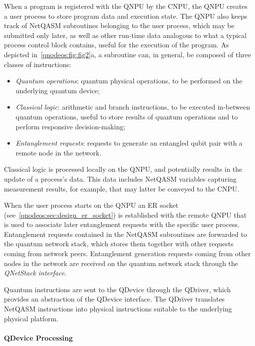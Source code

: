 When a program is registered with the \ac{QNPU} by the \ac{CNPU}, the \ac{QNPU} creates a user process to store program data and execution state. The \ac{QNPU} also keeps track of \ac{NetQASM} subroutines belonging to the user process, which may be submitted only later, as well as other run-time data analogous to what a typical process control block contains, useful for the execution of the program. As depicted in~\cref{qnodeos:fig:fig2}a, a subroutine can, in general, be composed of three classes of instructions:

\begin{itemize}
\item \emph{Quantum operations}: quantum physical operations, to be performed on the underlying quantum device;
\item \emph{Classical logic}: arithmetic and branch instructions, to be executed in-between quantum operations, useful to store results of quantum operations and to perform responsive decision-making;
\item \emph{Entanglement requests}: requests to generate an entangled qubit pair with a remote node in the network.
\end{itemize}
%
Classical logic is processed locally on the \ac{QNPU}, and potentially results in the update of a process's data. This data includes \ac{NetQASM} variables capturing measurement results, for example, that may latter be conveyed to the \ac{CNPU}. 

When the user process starts on the \ac{QNPU} an \ac{ER} socket (see~\cref{qnodeos:sec:design_er_socket}) is established with the remote \ac{QNPU} that is used to associate later entanglement requests with the specific user process. Entanglement requests contained in the \ac{NetQASM} subroutines are forwarded to the quantum network stack,  which stores them together with other requests coming from network peers. Entanglement generation requests coming from other nodes in the network are received on the quantum network stack through the \emph{\ac{QNetStack} interface}.

Quantum instructions are sent to the \ac{QDevice} through the \ac{QDriver}, which provides an abstraction of the \ac{QDevice} interface. The \ac{QDriver} translates \ac{NetQASM} instructions into physical instructions suitable to the underlying physical platform.

\paragraph{QDevice Processing}

